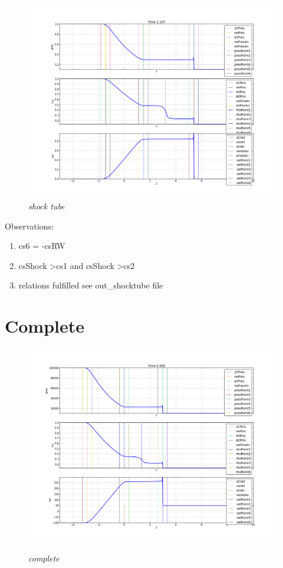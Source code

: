 \documentclass[12pt]{book}
\begin{document}
\begin{figure}[!h]
 \centering
 \includegraphics[scale=0.4]{shocktube.png}
	\caption{\emph{shock tube}}
 \label{Fig: 1}
\end{figure}


Observations:
\begin{enumerate}
\item cs6 = -csRW
\item csShock \textgreater cs1 and csShock \textgreater cs2
\item relations fulfilled see out\_shocktube file
\end{enumerate}


\section*{Complete}

\begin{figure}[!h]
 \centering
 \includegraphics[scale=0.4]{complete.png}
 \label{Fig: 1}
	\caption{\emph{complete}}
\end{figure}
\end{document}

